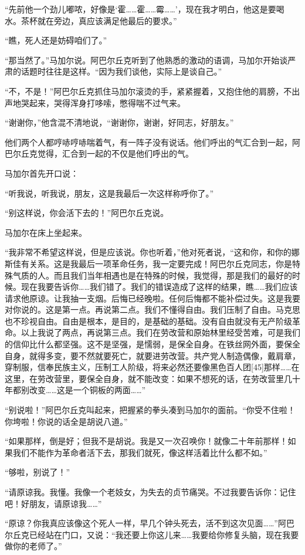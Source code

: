 “先前他一个劲儿嘟哝，好像是‘霍……霍……霉……’，现在我才明白，他这是要喝水。茶杯就在旁边，真应该满足他最后的要求。”

“瞧，死人还是妨碍咱们了。”

“那当然了。”马加尔说。阿巴尔丘克听到了他熟悉的激动的语调，马加尔开始谈严肃的话题时往往是这样。“因为我们谈他，实际上是谈自己。”

“不，不是！”阿巴尔丘克抓住马加尔滚烫的手，紧紧握着，又抱住他的肩膀，不出声地哭起来，哭得浑身打哆嗦，憋得喘不过气来。

“谢谢你，”他含混不清地说，“谢谢你，谢谢，好同志，好朋友。”

他们两个人都哼哧哼哧喘着气，有一阵子没有说话。他们呼出的气汇合到一起，阿巴尔丘克觉得，汇合到一起的不仅是他们呼出的气。

马加尔首先开口说：

“听我说，听我说，朋友，这是我最后一次这样称呼你了。”

“别这样说，你会活下去的！”阿巴尔丘克说。

马加尔在床上坐起来。

“我非常不希望这样说，但是应该说。你也听着，”他对死者说，“这和你，和你的娜斯佳有关系。这是我最后一项革命任务，我一定要完成！阿巴尔丘克同志，你是特殊气质的人。而且我们当年相遇也是在特殊的时候，我觉得，那是我们的最好的时候。现在我要告诉你……我们错了。我们的错误造成了这样的结果，瞧……我们应该请求他原谅。让我抽一支烟。后悔已经晚啦。任何后悔都不能补偿过失。这是我要对你说的。这是第一点。再说第二点。我们不懂得自由。我们压制了自由。马克思也不珍视自由。自由是根本，是目的，是基础的基础。没有自由就没有无产阶级革命。以上我说了两点，再说第三点。我们在劳改营和原始林里经受苦难，可是我们的信仰比什么都坚强。这不是坚强，是懦弱，是保全自身。在铁丝网外面，要保全自身，就得多变，要不然就要死亡，就要进劳改营。共产党人制造偶像，戴肩章，穿制服，信奉民族主义，压制工人阶级，将来必然还要像黑色百人团[45]那样……在这里，在劳改营里，要保全自身，就不能改变：如果不想死的话，在劳改营里几十年都别改变……这是一个铜板的两面……”

“别说啦！”阿巴尔丘克叫起来，把握紧的拳头凑到马加尔的面前。“你受不住啦！你垮啦！你说的话全是胡说八道。”

“如果那样，倒是好；但我不是胡说。我是又一次召唤你！就像二十年前那样！如果我们不能作为革命者活下去，那我们就死，像这样活着比什么都不如。”

“够啦，别说了！”

“请原谅我。我懂。我像一个老妓女，为失去的贞节痛哭。不过我要告诉你：记住吧！好朋友，请原谅我……”

“原谅？你我真应该像这个死人一样，早几个钟头死去，活不到这次见面……”阿巴尔丘克已经站在门口，又说：“我还要上你这儿来……我要给你修复头脑，现在我要做你的老师了。”

